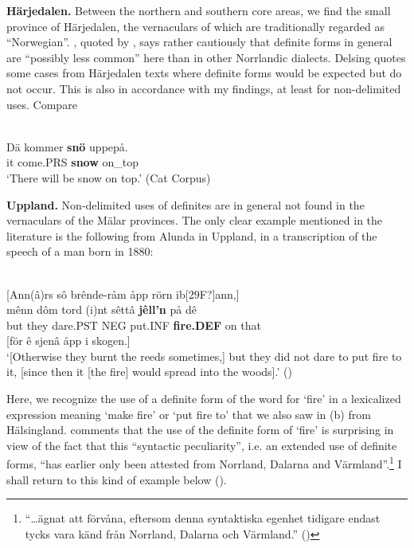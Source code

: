 \textbf{Härjedalen.} Between the northern and southern core areas, we find the small province of Härjedalen, the vernaculars of which are traditionally regarded as “Norwegian”. \citet[28]{Reinhammar1973}, quoted by \citet[19]{Delsing2003a}, says rather cautiously that definite forms in general are “possibly less common” here than in other Norrlandic dialects. Delsing quotes some cases from Härjedalen texts where definite forms would be expected but do not occur. This is also in accordance with my findings, at least for non-delimited uses. Compare

\ea \label{} 
\\
\gll Dä  kommer  \textbf{snö} uppepå.\\
it  come.PRS  \textbf{snow} on\_top\\
\glt ‘There will be snow on top.’ (Cat Corpus)

\z

\textbf{Uppland. }Non-delimited uses of definites are in general not found in the vernaculars of the Mälar provinces. The only clear example mentioned in the literature is the following from Alunda in Uppland, in a transcription of the speech of a man born in 1880:

\ea \label{} 
\\ \label{bkm:Ref154222780}
 {}[Ann(â)rs sô brênde-råm åpp rörn ib[29F?]ann,] \\
\gll mênn  dôm  tord  (i)nt  sêttâ  \textbf{jêll’n} på  dê  \\
but  they  dare.PST  NEG  put.INF  \textbf{fire.DEF} on   that  \\
{} [för ê sjenâ åpp i skogen.]\\
\glt ‘[Otherwise they burnt the reeds sometimes,] but they did not dare to put fire to it, [since then it [the fire] would spread into the woods].’ (\citet[60]{Västerlund1988})

\z

Here, we recognize the use of a definite form of the word for ‘fire’ in a lexicalized expression meaning ‘make fire’ or ‘put fire to’ that we also saw in (b) from Hälsingland. \citet[40]{Västerlund1988} comments that the use of the definite form of  ‘fire’ is surprising in view of the fact that this “syntactic peculiarity”, i.e. an extended use of definite forms, “has earlier only been attested from Norrland, Dalarna and Värmland”.\footnote{ “…ägnat att förvåna, eftersom denna syntaktiska egenhet tidigare endast tycks vara känd från Norrland, Dalarna och Värmland.” (\citet[60]{Västerlund1988})} I shall return to this kind of example below ().

